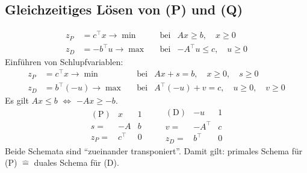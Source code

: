 \subsection{Gleichzeitiges Lösen von (P) und (Q)}
\begin{align*}
  z_P &= c^\top x \to \min & &\text{bei} & Ax \ge b, \quad x \ge 0 \tag{P} \\
  z_D &= -b^\top u \to \max & &\text{bei} & -A^\top u \le c, \quad u
        \ge 0 \tag{D}
\end{align*}
Einführen von Schlupfvariablen:
\begin{align*}
  z_P &= c^\top x \to \min & &\text{bei} & Ax + s = b, \quad x \ge 0, \quad s \ge 0 \tag{P} \\
  z_D &= b^\top (-u) \to \max & &\text{bei} & A^\top (-u) + v = c, \quad u
        \ge 0, \quad v \ge 0 \tag{D}
\end{align*}
Es gilt $Ax \le b$ $\Leftrightarrow$ $-Ax \ge -b$.
\[ \begin{array}{r|cc}
     (\mathrm{P}) & x & 1 \\
     \hline
     s = & -A & b \\
     z_P = & c^\top & 0
   \end{array}
   \qquad
   \begin{array}{r|cc}
     (\mathrm{D}) & -u & 1 \\
     \hline
     v = & -A^\top & c \\
     z_D = & b^\top & 0
   \end{array}
\]
Beide Schemata sind ``zueinander transponiert''. Damit gilt: primales Schema
für (P) $\hat{=}$ duales Schema für (D).


